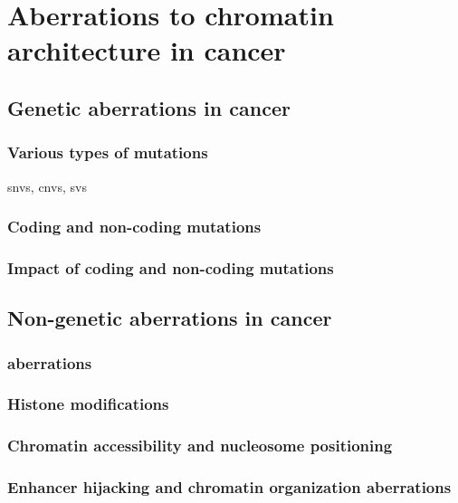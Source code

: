 


\section{Aberrations to chromatin architecture in cancer}

\subsection{Genetic aberrations in cancer}

\subsubsection{Various types of mutations}

\glspl{snv}, \glspl{cnv}, \glspl{sv}

\subsubsection{Coding and non-coding mutations}

\subsubsection{Impact of coding and non-coding mutations}

\subsection{Non-genetic aberrations in cancer}

\subsubsection{ aberrations}

\subsubsection{Histone modifications}

\subsubsection{Chromatin accessibility and nucleosome positioning}

\subsubsection{Enhancer hijacking and chromatin organization aberrations}

